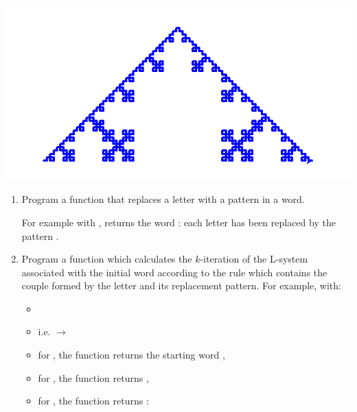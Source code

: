 \documentclass[11pt,class=report,crop=false]{standalone}
\begin{document}
\begin{activite}



\begin{center}
\includegraphics[scale=\myscale,scale=0.4]{screen-lsystems-2}
\end{center}

\begin{enumerate}
  \item Program a function  that replaces a letter with a pattern in a word. 

For example with ,  returns the word : each letter  has been replaced by the pattern .
 
  \item Program a function 
  which calculates the $k$-iteration of the L-system associated with the initial word  according to the rule  which contains the couple formed by the letter and its replacement pattern.
  For example, with:
  \begin{itemize}
    \item {}
    \item {} i.e.  $\rightarrow$ 
    \item for , the function returns the starting word ,
    \item for , the function returns ,
    \item for , the function returns :  
     

\end{itemize}
\end{enumerate}
\end{activite}
\end{document}
